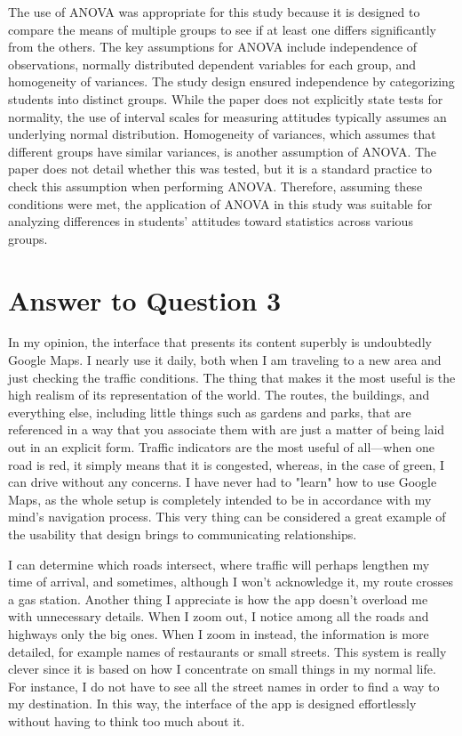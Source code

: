 \documentclass[
	letterpaper, %
]{jdf}
\begin{document}
The use of ANOVA was appropriate for this study because it is designed to compare the means of multiple groups to see if at least one differs significantly from the others. The key assumptions for ANOVA include independence of observations, normally distributed dependent variables for each group, and homogeneity of variances. The study design ensured independence by categorizing students into distinct groups. While the paper does not explicitly state tests for normality, the use of interval scales for measuring attitudes typically assumes an underlying normal distribution. Homogeneity of variances, which assumes that different groups have similar variances, is another assumption of ANOVA. The paper does not detail whether this was tested, but it is a standard practice to check this assumption when performing ANOVA. Therefore, assuming these conditions were met, the application of ANOVA in this study was suitable for analyzing differences in students' attitudes toward statistics across various groups.

\newpage

\section{Answer to Question 3}
In my opinion, the interface that presents its content superbly is undoubtedly Google Maps. I nearly use it daily, both when I am traveling to a new area and just checking the traffic conditions. The thing that makes it the most useful is the high realism of its representation of the world. The routes, the buildings, and everything else, including little things such as gardens and parks, that are referenced in a way that you associate them with are just a matter of being laid out in an explicit form. Traffic indicators are the most useful of all—when one road is red, it simply means that it is congested, whereas, in the case of green, I can drive without any concerns. I have never had to "learn" how to use Google Maps, as the whole setup is completely intended to be in accordance with my mind's navigation process. This very thing can be considered a great example of the usability that design brings to communicating relationships. 

I can determine which roads intersect, where traffic will perhaps lengthen my time of arrival, and sometimes, although I won't acknowledge it, my route crosses a gas station. Another thing I appreciate is how the app doesn’t overload me with unnecessary details. When I zoom out, I notice among all the roads and highways only the big ones. When I zoom in instead, the information is more detailed, for example names of restaurants or small streets. This system is really clever since it is based on how I concentrate on small things in my normal life. For instance, I do not have to see all the street names in order to find a way to my destination. In this way, the interface of the app is designed effortlessly without having to think too much about it.
\end{document}
